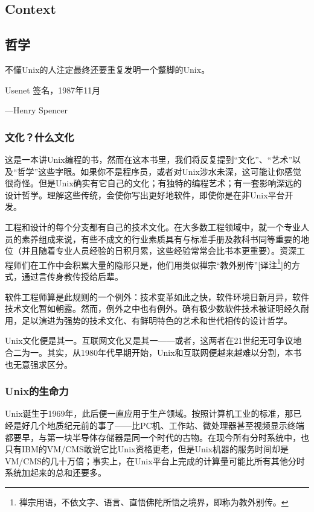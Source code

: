 \documentclass[12pt,oneside]{ctexbook}
\begin{document}
\setcounter{tocdepth}{3}
\tableofcontents

\begin{common-format}
\mainmatter

\part{Context}
\chapter{哲学}

\begin{flushright}
\begin{notecard}{17em}
不懂Unix的人注定最终还要重复发明一个蹩脚的Unix。

{\hfill Usenet 签名，1987年11月}

{\hfill —Henry Spencer}
\end{notecard}
\end{flushright}


\section{文化？什么文化}
这是一本讲Unix编程的书，然而在这本书里，我们将反复提到“文化”、“艺术”以及“哲学”这些字眼。如果你不是程序员，或者对Unix涉水未深，这可能让你感觉很奇怪。但是Unix确实有它自己的文化；有独特的编程艺术；有一套影响深远的设计哲学。理解这些传统，会使你写出更好地软件，即使你是在非Unix平台开发。

工程和设计的每个分支都有自己的技术文化。在大多数工程领域中，就一个专业人员的素养组成来说，有些不成文的行业素质具有与标准手册及教科书同等重要的地位（并且随着专业人员经验的日积月累，这些经验常常会比书本更重要）。资深工程师们在工作中会积累大量的隐形只是，他们用类似禅宗“教外别传”[译注\footnote{禅宗用语，不依文字、语言、直悟佛陀所悟之境界，即称为教外别传。}]的方式，通过言传身教传授给后辈。

软件工程师算是此规则的一个例外：技术变革如此之快，软件环境日新月异，软件技术文化暂如朝露。然而，例外之中也有例外。确有极少数软件技术被证明经久耐用，足以演进为强势的技术文化、有鲜明特色的艺术和世代相传的设计哲学。

Unix文化便是其一。互联网文化又是其一——或者，这两者在21世纪无可争议地合二为一。其实，从1980年代早期开始，Unix和互联网便越来越难以分割，本书也无意强求区分。


\section{Unix的生命力}
Unix诞生于1969年，此后便一直应用于生产领域。按照计算机工业的标准，那已经是好几个地质纪元前的事了——比PC机、工作站、微处理器甚至视频显示终端都要早，与第一块半导体存储器是同一个时代的古物。在现今所有分时系统中，也只有IBM的VM/CMS敢说它比Unix资格更老，但是Unix机器的服务时间却是VM/CMS的几十万倍；事实上，在Unix平台上完成的计算量可能比所有其他分时系统加起来的总和还要多。


\end{common-format}
\end{document}
